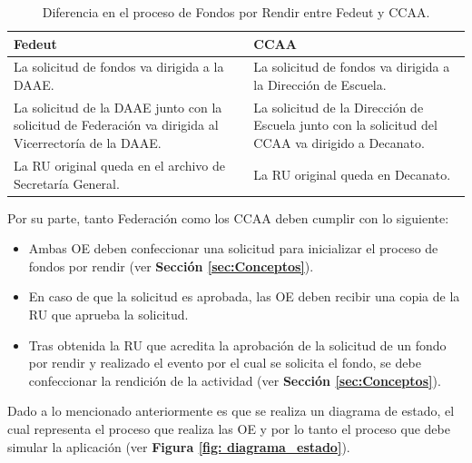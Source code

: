 \begin{table}[htbp]
    
    \caption{\label{tab: tab_dif_proc_FpR} Diferencia en el proceso de Fondos por Rendir entre Fedeut y CCAA. }
    \footnotesize
    \begin{tabular}{|p{7.1cm}|p{7.1cm}|}
    
    \hline
    \textbf{Fedeut} & \textbf{CCAA} \\
    
    \hline\hline
    
    La solicitud de fondos va dirigida a la DAAE. & La solicitud de fondos va dirigida a la Dirección de Escuela.\\ \hline

    La solicitud de la DAAE junto con la solicitud de Federación va dirigida al Vicerrectoría de la DAAE. & La solicitud de la Dirección de Escuela junto con la solicitud del CCAA va dirigido a Decanato.\\ \hline

    La RU original queda en el archivo de Secretaría General. & La RU original queda en Decanato.\\ \hline

    \end{tabular}  
\end{table}

Por su parte, tanto Federación como los CCAA deben cumplir con lo siguiente:

\begin{itemize}
    \item Ambas OE deben confeccionar una solicitud para inicializar el proceso de fondos por rendir (ver \textbf{Sección \ref{sec:Conceptos}}).
    \item En caso de que la solicitud es aprobada, las OE deben recibir una copia de la RU que aprueba la solicitud.
    \item Tras obtenida la RU que acredita la aprobación de la solicitud de un fondo por rendir y realizado el evento por el cual se solicita el fondo, se debe confeccionar la rendición de la actividad (ver \textbf{Sección \ref{sec:Conceptos}}).
\end{itemize}

Dado a lo mencionado anteriormente es que se realiza un diagrama de estado, el cual representa el proceso que realiza las OE y por lo tanto el proceso que debe simular la aplicación (ver \textbf{Figura \ref{fig: diagrama_estado}}).


